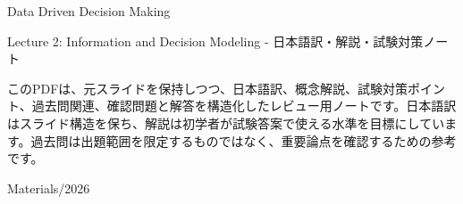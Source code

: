 \documentclass[a4paper,10pt]{article}
\begin{document}
\begin{titlepage}
\centering
\vspace*{2cm}
{\Huge Data Driven Decision Making\par}
\vspace{0.5cm}
{\Large Lecture 2: Information and Decision Modeling - 日本語訳・解説・試験対策ノート\par}
\vspace{1cm}
\begin{minipage}{0.88\textwidth}
このPDFは、元スライドを保持しつつ、日本語訳、概念解説、試験対策ポイント、過去問関連、確認問題と解答を構造化したレビュー用ノートです。日本語訳はスライド構造を保ち、解説は初学者が試験答案で使える水準を目標にしています。過去問は出題範囲を限定するものではなく、重要論点を確認するための参考です。
\end{minipage}
\vfill
{\large Materials/2026}\par
\end{titlepage}
\tableofcontents
\clearpage

\end{document}
